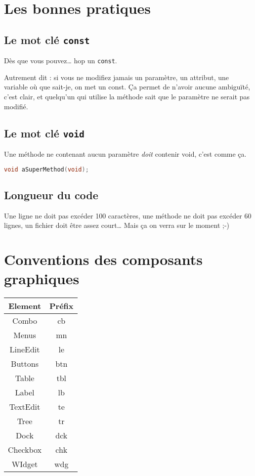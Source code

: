 \section{Les bonnes pratiques}\label{les-bonnes-pratiques}

\subsection{Le mot clé \texttt{const}}\label{le-mot-cluxe9-const}

Dès que vous pouvez\ldots{} hop un \texttt{const}.

Autrement dit : si vous ne modifiez jamais un paramètre, un attribut, une
variable où que sait-je, on met un const. Ça permet de n'avoir aucune
ambiguïté, c'est clair, et quelqu'un qui utilise la méthode sait que le
paramètre ne serait pas modifié.

\subsection{Le mot clé \texttt{void}}\label{le-mot-cluxe9-void} 
Une méthode ne contenant aucun paramètre \emph{doit} contenir void,
c'est comme ça.

\begin{lstlisting}[language=C++,numbers=none]
void aSuperMethod(void);
\end{lstlisting}

\subsection{Longueur du code}\label{longueur-du-code}

Une ligne ne doit pas excéder 100 caractères, une méthode ne doit pas
excéder 60 lignes, un fichier doit être assez court\ldots{} Mais ça on
verra sur le moment ;-)

\section{Conventions des composants
graphiques}\label{conventions-des-composants-graphiques}
\begin{tabular}{c|c}
Element & Préfix\\
\hline
Combo & cb\\
Menus & mn\\
LineEdit & le\\
Buttons & btn\\
Table & tbl\\
Label & lb\\
TextEdit & te\\
Tree & tr\\
Dock & dck\\
Checkbox & chk\\
WIdget & wdg\\
\end{tabular}

